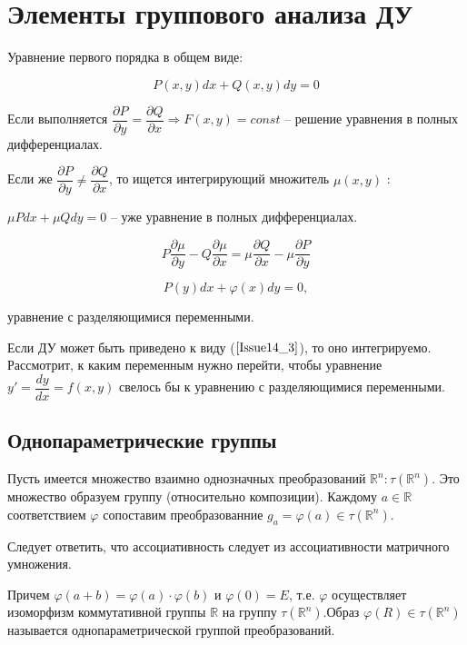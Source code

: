 
\section{Элементы группового анализа ДУ}

Уравнение первого порядка в общем виде:

\begin{equation}
	P(x,y)dx + Q(x,y)dy = 0
	\label{Issue14_1}
\end{equation}

Если выполняется $\dfrac{\partial P}{\partial y} = \dfrac{\partial Q}{\partial x} \Rightarrow F(x,y) = const$ -- решение уравнения в полных дифференциалах.

Если же $\dfrac{\partial P}{\partial y} \neq \dfrac{\partial Q}{\partial x}$, то ищется интегрирующий множитель $\mu(x,y)$ :

$\mu Pdx + \mu Qdy = 0$ -- уже уравнение в полных дифференциалах.

\begin{equation}
	P\frac{\partial \mu}{\partial y} - Q \frac{\partial \mu}{\partial x} = \mu \dfrac{\partial Q}{\partial x} - \mu \dfrac{\partial P}{\partial y}
	\label{Issue14_2}
\end{equation}

\begin{equation}
	P(y)dx + \varphi(x)dy = 0,
	\label{Issue14_3}
\end{equation}

уравнение с разделяющимися переменными.

Если ДУ может быть приведено к виду ($\ref{Issue14_3}$), то оно интегрируемо. Рассмотрит, к каким переменным нужно перейти, чтобы уравнение $y' = \dfrac{dy}{dx} = f(x,y)$ свелось бы к уравнению с разделяющимися переменными.

\subsection{Однопараметрические группы}

Пусть имеется множество взаимно однозначных преобразований $\mathbb{R}^n: \tau(\mathbb{R}^n)$.
Это множество образуем группу (относительно композиции). Каждому $a \in \mathbb{R}$ соответствием $\varphi$ сопоставим преобразованние $g_a = \varphi(a) \in \tau(\mathbb{R}^n)$.

Следует ответить, что ассоциативность следует из ассоциативности матричного умножения.

Причем $\varphi(a+b) = \varphi(a)\cdot \varphi(b)$ и $\varphi(0) = E$, т.е. $\varphi$ осуществляет изоморфизм коммутативной группы $\mathbb{R}$ на группу $\tau(\mathbb{R}^n)$.Образ $\varphi(R) \in \tau(\mathbb{R}^n)$ называется однопараметрической группой преобразований.

